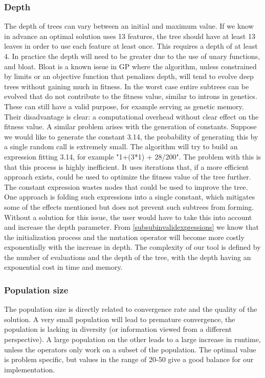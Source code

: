 \subsubsection{Depth}
The depth of trees can vary between an initial and maximum value. If we know in advance an optimal solution uses 13 features, the tree should have at least 13 leaves in order to use each feature at least once. This requires a depth of at least 4. In practice the depth will need to be greater due to the use of unary functions, and bloat. Bloat is a known issue in GP \cite{GPBloat}
where the algorithm, unless constrained by limits or an objective function that penalizes depth, will tend to evolve deep trees without gaining much in fitness. In the worst case entire subtrees can be evolved that do not contribute to the fitness value, similar to introns in genetics. These can still have a valid purpose, for example serving as genetic memory. Their disadvantage is clear: a computational overhead without clear effect on the fitness value.
A similar problem arises with the generation of constants. Suppose we would like to generate the constant 3.14, the probability of generating this by a single random call is extremely small. The algorithm will try to build an expression fitting 3.14, for example "1+(3*1) + 28/200". The problem with this is that this process is highly inefficient. It uses iterations that, if a more efficient approach exists, could be used to optimize the fitness value of the tree further. The constant expression wastes nodes that could be used to improve the tree. One approach is folding such expressions into a single constant, which mitigates some of the effects mentioned but does not prevent such subtrees from forming.
Without a solution for this issue, the user would have to take this into account and increase the depth parameter. 
From \ref{subsubinvalidexpressions} we know that the initialization process and the mutation operator will become more costly exponentially with the increase in depth.
The complexity of our tool is defined by the number of evaluations and the depth of the tree, with the depth having an exponential cost in time and memory.

\subsubsection{Population size}
The population size is directly related to convergence rate and the quality of the solution. A very small population will lead to premature convergence, the population is lacking in diversity (or information viewed from a different perspective).
A large population on the other leads to a large increase in runtime, unless the operators only work on a subset of the population. The optimal value is problem specific, but values in the range of 20-50 give a good balance for our implementation.

